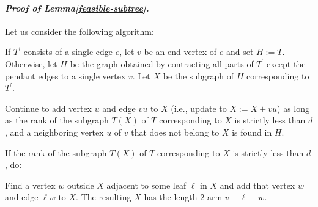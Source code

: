 \documentclass[letter,11pt]{article}
\newcommand{\white}{\qquad{\framebox{\rule{0pt}{4pt}}}}
\newcommand{\owari}{\hfill\white}
\theoremstyle{definition}
\theoremstyle{definition}
\newcommand{\1}{\boldmath$~1~$\unboldmath}
\newcommand{\qedgo}{\vspace{0.35cm}}
\newcommand{\tume}{\hspace*{0.2em}}
\newcommand{\maru}[1]{{\ooalign{\hfill$\small#1$\hfill\crcr\scalebox{1.3}{$\bigcirc$}}}}
\newenvironment{alg-enumerate}{%
  \begin{enumerate}%
   \renewcommand{\theenumi}{\arabic{enumi}}%
   \renewcommand{\labelenumi}{\rm{{\maru{\theenumi}}\tume\/}}%
   \renewcommand{\labelenumii}{\rm{$(${\maru{\theenumi}}-\theenumii$)$\tume\/}}%
 }{\end{enumerate}%
}
\newenvironment{Proofof}[1]{\expandafter
\paragraph{{\it Proof of #1.}}}{\hspace{5mm}\owari\qedgo}
\begin{document}
\begin{Proofof}{Lemma\tume\ref{feasible-subtree}}
Let us consider the following algorithm:
\begin{alg-enumerate}
\item{If $T^{\prime}$ consists of a single edge $e$, let $v$ be an end-vertex of $e$ and set $H:=T$. 
Otherwise, let $H$ be the graph obtained by contracting all parts of $T^{\prime}$ except the pendant edges 
to a single vertex $v$. Let $X$ be the subgraph of $H$ corresponding to $T^{\prime}$. }
\item{Continue to add vertex $u$ and edge $vu$ to $X$ (i.e., update to $X:=X+vu$) as long as 
the rank of the subgraph $T(X)$ of $T$ corresponding to $X$ is strictly less than $d$, and 
a neighboring vertex $u$ of $v$ that does not belong to $X$ is found in $H$.}\label{leaf-add}
\item{If the rank of the subgraph $T(X)$ of $T$ corresponding to $X$ is strictly less than $d$, do:
\begin{alg-enumerate}
\item{Find a vertex $w$ outside $X$ adjacent to some leaf $\ell$ in $X$ and add that vertex $w$ and edge $\ell{w}$ to $X$. 
The resulting $X$ has the length $2$ arm $v-\ell-w$.}

\end{alg-enumerate}}
\end{alg-enumerate}
\end{Proofof}
\end{document}
